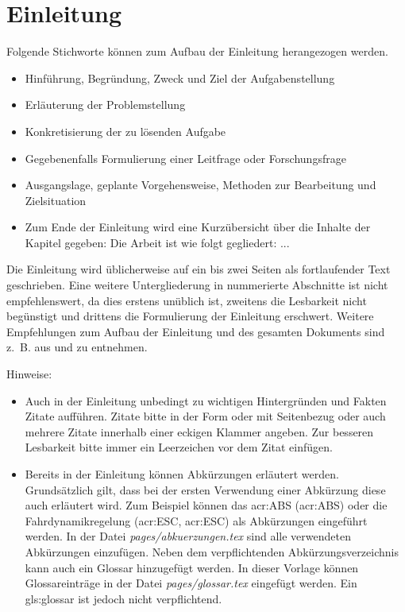 \chapter{Einleitung}
\label{cha:Einleitung}

Folgende Stichworte können zum Aufbau der Einleitung herangezogen werden.

\begin{itemize}
\item Hinführung, Begründung, Zweck und Ziel der Aufgabenstellung
\item Erläuterung der Problemstellung
\item Konkretisierung der zu lösenden Aufgabe
\item Gegebenenfalls Formulierung einer Leitfrage oder Forschungsfrage
\item Ausgangslage, geplante Vorgehensweise, Methoden zur Bearbeitung und Zielsituation
\item Zum Ende der Einleitung wird eine Kurzübersicht über die Inhalte der Kapitel gegeben: \glqq Die Arbeit ist wie folgt gegliedert: ...\grqq
\end{itemize}

Die Einleitung wird üblicherweise auf ein bis zwei Seiten als fortlaufender Text geschrieben. Eine weitere Untergliederung in nummerierte Abschnitte ist nicht empfehlenswert, da dies erstens unüblich ist, zweitens die Lesbarkeit nicht begünstigt und drittens die Formulierung der Einleitung erschwert. Weitere Empfehlungen zum Aufbau der Einleitung und des gesamten Dokuments sind z.~B. aus \autocite{DHBW.2021} und \autocite{Lindenlauf.2022} zu entnehmen.

\clearpage

Hinweise: 

\begin{itemize}
\item Auch in der Einleitung unbedingt zu wichtigen Hintergründen und Fakten Zitate aufführen. Zitate bitte in der Form \autocite{Tipler.2019} oder mit Seitenbezug \autocite[66]{Ziegler.2017} oder auch mehrere Zitate  \autocite{Tipler.2019, Ziegler.2017} innerhalb einer eckigen Klammer angeben. Zur besseren Lesbarkeit bitte immer ein Leerzeichen vor dem Zitat einfügen.
	
\item Bereits in der Einleitung können Abkürzungen erläutert werden. Grundsätzlich gilt, dass bei der ersten Verwendung einer Abkürzung diese auch erläutert wird. Zum Beispiel können das \acrlong{acr:ABS}  (\acrshort{acr:ABS}) oder die Fahrdynamikregelung (\acrlong{acr:ESC}, \acrshort{acr:ESC}) als Abkürzungen eingeführt werden. In der Datei \textit{pages/abkuerzungen.tex} sind alle verwendeten Abkürzungen einzufügen. Neben dem verpflichtenden Abkürzungsverzeichnis kann auch ein Glossar hinzugefügt werden. In dieser Vorlage können Glossareinträge in der Datei \textit{pages/glossar.tex} eingefügt werden. Ein \Gls{gls:glossar} ist jedoch nicht verpflichtend.
\end{itemize}